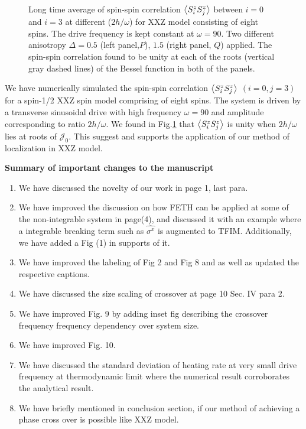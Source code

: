 \documentclass[aps,prb,reprint,showpacs,floatfix,superscriptaddress, onecolumn, nofootinbib, 9pt]{revtex4-2}
\begin{document}
\begin{enumerate}
{\begin{figure}[t]
	\caption{Long time average of spin-spin correlation $\expval{S^z_i S^z_{j}}$ between $i=0$ and $i=3$ at different ($2h/\omega$) for XXZ model consisting of eight spins. The drive frequency is kept constant at $\omega = 90$. Two different anisotropy $\Delta = 0.5$ (left panel,$P$), $1.5$ (right panel, $Q$) applied. The spin-spin correlation found to be unity at each of the roots (vertical gray dashed lines) of the Bessel function in both of the panels.}
	\label{fig:std_Ns}
\end{figure}
We have numerically simulated the spin-spin correlation $\expval{S^z_i S^z_j}$ $(i=0,j=3)$ for a spin-1/2 XXZ spin model comprising of eight spins. The system is driven by a transverse sinusoidal drive with high frequency $\omega =90$ and amplitude corresponding to ratio $2h/\omega$. We found in Fig.\ref{fig:std_Ns} that $\expval{S^z_i S^z_j}$ is unity when $2h/\omega$ lies at roots of $\mathcal{J}_0$. This suggest  and supports the application of our method of localization in XXZ model.
}
\end{enumerate}

\vskip 1cm 
\noindent \textbf{Summary of important changes to the  manuscript}

\begin{enumerate}
	\item We have discussed the novelty of our work in page 1, last para.
	\item We have improved the discussion on how FETH can be applied at some of the non-integrable system in page(4), and discussed it with an example where a integrable breaking term such as $\hat{\sigma^x}$ is augmented to TFIM. Additionally, we have added a Fig (1) in supports of it.
	\item We have improved the labeling of Fig 2 and Fig 8 and as well as updated the respective captions.
	\item We have discussed the size scaling of crossover at page 10 Sec. IV para 2.
	\item We have improved Fig. 9 by adding inset fig describing the crossover frequency frequency dependency over system size.
	\item We have improved Fig. 10.
	\item We have discussed the standard deviation of heating rate at very small drive frequency at thermodynamic limit where the numerical result corroborates the analytical result.
	\item We have briefly mentioned in conclusion section, if our method of achieving a phase cross over is possible like XXZ model. 
\end{enumerate}


	
	
\end{document}
